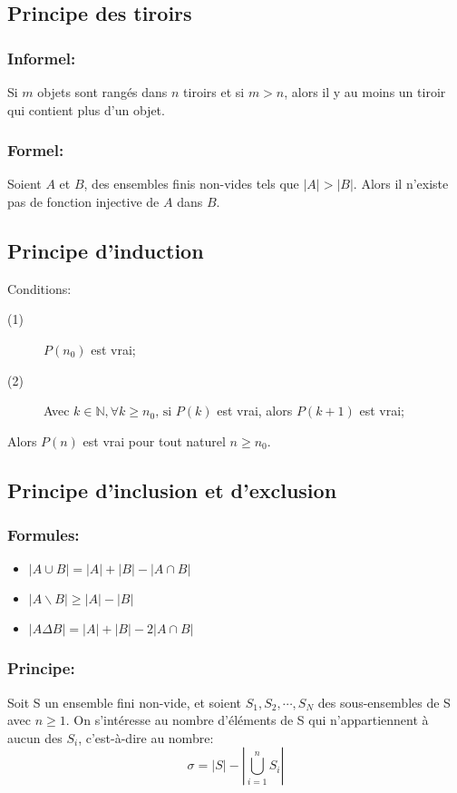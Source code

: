 \subsection{Principe des tiroirs}
\subsubsection*{Informel:}
Si $m$ objets sont rangés dans $n$ tiroirs et si $m > n$,
alors il y au moins un tiroir qui contient plus d'un objet.

\subsubsection*{Formel:}
Soient $A$ et $B$, des ensembles finis non-vides tels que $|A| > |B|$.
Alors il n'existe pas de fonction injective de $A$ dans $B$.

\subsection{Principe d'induction}
Conditions:
\begin{description}
\item[(1)] $P(n_0)$ est vrai;
\item[(2)] Avec $k \in \mathbb{N} , \forall k \geq n_0 \text{, si }P(k)$ est vrai, alors $P(k+1)$ est vrai;
\end{description}
Alors $P(n)$ est vrai pour tout naturel $n \geq n_0$.
\subsection{Principe d'inclusion et d'exclusion}
\subsubsection*{Formules:}
\begin{itemize}
\item $|A \cup B| = |A| + |B| - |A \cap B|$
\item $|A\backslash B| \geq |A| - |B|$
\item $|A \Delta B| = |A| + |B| - 2|A \cap B|$
\end{itemize}
\subsubsection*{Principe:}
Soit S un ensemble fini non-vide, et soient $S_1, S_2, \cdots ,S_N$ des sous-ensembles de S avec $n \geq 1$. On s'intéresse au nombre d'éléments de S qui n'appartiennent à aucun des $S_i$, c'est-à-dire au nombre:
\[ \sigma =|S| - \left | \bigcup_{i = 1}^n S_i \right | \]
